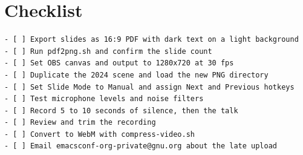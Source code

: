\documentclass[11pt]{article}
\begin{document}
\section*{Checklist}
\label{sec:orge937168}

\begin{verbatim}
- [ ] Export slides as 16:9 PDF with dark text on a light background
- [ ] Run pdf2png.sh and confirm the slide count
- [ ] Set OBS canvas and output to 1280x720 at 30 fps
- [ ] Duplicate the 2024 scene and load the new PNG directory
- [ ] Set Slide Mode to Manual and assign Next and Previous hotkeys
- [ ] Test microphone levels and noise filters
- [ ] Record 5 to 10 seconds of silence, then the talk
- [ ] Review and trim the recording
- [ ] Convert to WebM with compress-video.sh
- [ ] Email emacsconf-org-private@gnu.org about the late upload
\end{verbatim}
\end{document}

